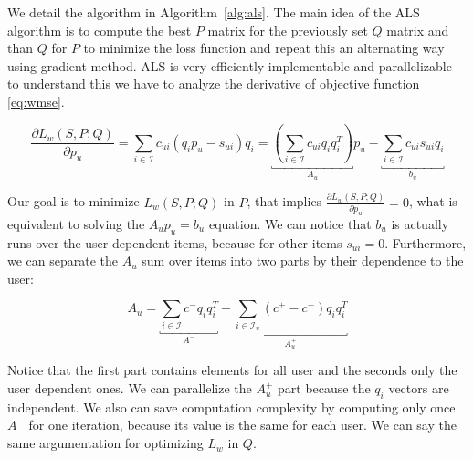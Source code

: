  We detail the algorithm \cite{takacs2012alternating} in Algorithm~\ref{alg:als}. The main idea
 of  the ALS algorithm is to compute the best $P$ matrix for the previously set $Q$ matrix  and
 than $Q$ for $P$ to minimize the loss function and repeat this an alternating way using gradient
 method. ALS is very efficiently implementable and parallelizable to understand this we have to analyze the derivative of objective function \eqref{eq:wmse}.

\[
\frac{\partial L_{w}(S,P;Q)}{\partial p_u} = \sum_{i\in \mathcal{I}} c_{ui}\left(q_ip_u- s_{ui}\right)q_i =
\underbracket{\left(\sum_{i\in\mathcal{I}}c_{ui}q_iq_i^T\right)}_{A_{u}}p_u-
\underbracket{\sum_{i\in\mathcal{I}}c_{ui}s_{ui}q_i}_{b_u}
\]

Our goal is to minimize $L_{w}(S,P;Q)$ in $P$, that implies 
$\frac{\partial L_{w}(S,P;Q)}{\partial p_u}=0$, what is equivalent to solving the $A_{u}p_{u}=b_{u}$ equation. We can notice that $b_u$ is actually runs over the user dependent items, because for other items  $s_{ui}=0$. Furthermore, we can separate the $A_u$ sum over items into two parts by their dependence to the user:

\[A_{u}=\underbracket{\sum_{i\in \mathcal{I}}c^-q_i q_i^T}_{A^-} +
\underbracket{\sum_{i\in\mathcal{I}_{u}}(c^+-c^-)q_i q_i^T}_{A_{u}^{+}} \]

Notice that the first part contains  elements for all user and the seconds only the user
dependent ones. We can parallelize the $A^{+}_{u}$ part because the $q_i$
vectors are independent. We also can save computation complexity by computing only once $A^-$ 
for one iteration, because its value is the same for each user. 
We can say the same argumentation for optimizing $L_{w}$ in $Q$.

